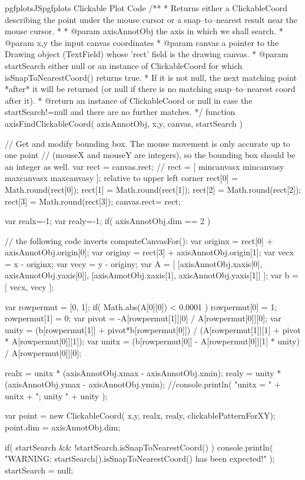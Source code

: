 {{\begin{insDLJS}[processAnnotatedPlot]{pgfplotsJS}{pgfplots Clickable Plot Code}
/**
 * Returns either a ClickableCoord describing the point under the mouse cursor or a snap--to--nearest result near the mouse cursor.
 *
 * @param axisAnnotObj the axis in which we shall search.
 * @param x,y the input canvas coordinates
 * @param canvas a pointer to the Drawing object (TextField) whose 'rect' field is the drawing canvas.
 * @param startSearch either null or an instance of ClickableCoord for which isSnapToNearestCoord() returns true. 
 *   If it is not null, the next matching point *after* it will be returned (or null if there is no matching snap--to--nearest coord after it).
 * @return an instance of ClickableCoord or null in case the startSearch!=null and there are no further matches.
 */
function axisFindClickableCoord( axisAnnotObj, x,y, canvas, startSearch )
{
	// Get and modify bounding box. The mouse movement is only accurate up to one point 
	// (mouseX and mouseY are integers), so the bounding box should be an integer as well.
	var rect = canvas.rect; // rect = [ mincanvasx mincanvasy maxcanvasx maxcanvasy ]; relative to upper left corner
	rect[0] = Math.round(rect[0]);
	rect[1] = Math.round(rect[1]);
	rect[2] = Math.round(rect[2]);
	rect[3] = Math.round(rect[3]);
	canvas.rect= rect;

	var realx=-1;
	var realy=-1;
	if( axisAnnotObj.dim == 2 ) {
		// the following code inverts computeCanvasFor():
		var originx = rect[0] + axisAnnotObj.origin[0];
		var originy = rect[3] + axisAnnotObj.origin[1];
		var vecx = x - originx;
		var vecy = y - originy;
		var A = [ 
			[axisAnnotObj.xaxis[0], axisAnnotObj.yaxis[0]],
			[axisAnnotObj.xaxis[1], axisAnnotObj.yaxis[1]] ];
		var b = [ vecx, vecy ];

		var rowpermut = [0, 1];
		if( Math.abs(A[0][0]) < 0.0001 ) {
			rowpermut[0] = 1;
			rowpermut[1] = 0;
		}
		var pivot = -A[rowpermut[1]][0] / A[rowpermut[0]][0];
		var unity = (b[rowpermut[1]] + pivot*b[rowpermut[0]]) / (A[rowpermut[1]][1] + pivot * A[rowpermut[0]][1]);
		var unitx = (b[rowpermut[0]] - A[rowpermut[0]][1] * unity) / A[rowpermut[0]][0];

		realx = unitx * (axisAnnotObj.xmax - axisAnnotObj.xmin);
		realy = unity * (axisAnnotObj.ymax - axisAnnotObj.ymin);
		//console.println( "unitx = " + unitx + "; unity " + unity );
	}


	var point = new ClickableCoord( x,y, realx, realy, clickablePatternForXY);
	point.dim = axisAnnotObj.dim;

	if( startSearch && !startSearch.isSnapToNearestCoord() ) {
		console.println( "WARNING: startSearch().isSnapToNearestCoord() has been expected!" );
		startSearch = null;
	}
	
}
\end{insDLJS}}}
